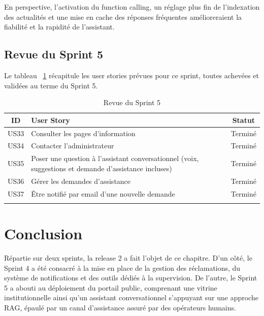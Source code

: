 \noindent En perspective, l'activation du function calling, un réglage plus fin de l'indexation des actualités et une mise en cache des réponses fréquentes amélioreraient la fiabilité et la rapidité de l'assistant.

\subsection{Revue du Sprint 5}

Le tableau ~\ref{tab:revue-sprint5} récapitule les user stories prévues pour ce sprint, toutes achevées et validées au terme du Sprint 5.

\begin{longtable}{|c|p{9cm}|c|}
\hline
\rowcolor{orange!30}
\textbf{ID} & \textbf{User Story} & \textbf{Statut} \\ \hline
US33 & Consulter les pages d'information & \textcolor{green!60!black}{Terminé} \\ \hline
US34 & Contacter l'administrateur & \textcolor{green!60!black}{Terminé} \\ \hline
US35 & Poser une question à l'assistant conversationnel (voix, suggestions et demande d'assistance incluses) & \textcolor{green!60!black}{Terminé} \\ \hline
US36 & Gérer les demandes d'assistance & \textcolor{green!60!black}{Terminé} \\ \hline
US37 & Être notifié par email d'une nouvelle demande & \textcolor{green!60!black}{Terminé} \\ \hline
\caption{Revue du Sprint 5}
\label{tab:revue-sprint5}
\end{longtable}

\section{Conclusion}

Répartie sur deux sprints, la release 2 a fait l'objet de ce chapitre. D'un côté, le Sprint 4 a été consacré à la mise en place de la gestion des réclamations, du système de notifications et des outils dédiés à la supervision. De l'autre, le Sprint 5 a abouti au déploiement du portail public, comprenant une vitrine institutionnelle ainsi qu'un assistant conversationnel s'appuyant sur une approche RAG, épaulé par un canal d'assistance assuré par des opérateurs humains.
